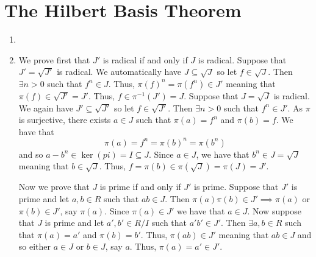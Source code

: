 \documentclass[letterpaper, 11pt, oneside]{book}
\begin{document}
\begin{sol}\label{ex:Curves_1.21}
\end{sol}

\clearpage

\section{The Hilbert Basis Theorem}

\begin{sol}\label{ex:Curves_1.22}
  \begin{enumerate}[label= (\alph*)]
    \item {}
    \item We prove first that $J'$ is radical if and only if $J$ is radical.
          Suppose that $J' = \sqrt{J'}$ is radical.
          We automatically have $J \subseteq \sqrt{J}$ so let $f \in \sqrt{J}$.
          Then $\exists n > 0$ such that $f^{n} \in J$.
          Thus, $\pi(f)^{n} = \pi(f^{n}) \in J'$ meaning that $\pi(f) \in \sqrt{J'} = J'$.
          Thus, $f \in \pi^{-1}(J') = J$.
          Suppose that $J = \sqrt{J}$ is radical.
          We again have $J' \subseteq \sqrt{J'}$ so let $f \in \sqrt{J'}$.
          Then $\exists n > 0$ such that $f^{n} \in J'$.
          As $\pi$ is surjective, there exists $a \in J$ such that $\pi(a) = f^{n}$ and $\pi(b) = f$.
          We have that
          \[
            \pi(a) = f^{n} = \pi(b)^{n} = \pi(b^{n})
          \]
          and so $a - b^{n} \in \ker(pi) = I \subseteq J$.
          Since $a \in J$, we have that $b^{n} \in J = \sqrt{J}$ meaning that $b \in \sqrt{J}$.
          Thus, $f = \pi(b) \in \pi(\sqrt{J}) = \pi(J) = J'$.

          Now we prove that $J$ is prime if and only if $J'$ is prime.
          Suppose that $J'$ is prime and let $a, b \in R$ such that $ab \in J$.
          Then $\pi(a)\pi(b) \in J' \implies \pi(a)$ or $\pi(b) \in J'$, say $\pi(a)$.
          Since $\pi(a) \in J'$ we have that $a \in J$.
          Now suppose that $J$ is prime and let $a', b' \in R/I$ such that $a'b' \in J'$.
          Then $\exists a, b \in R$ such that $\pi(a) = a'$ and $\pi(b) = b'$.
          Thus, $\pi(ab) \in J'$ meaning that $ab \in J$ and so either $a \in J$ or $b \in J$, say $a$.
          Thus, $\pi(a) = a' \in J'$.


\end{enumerate}
\end{sol}
\end{document}
